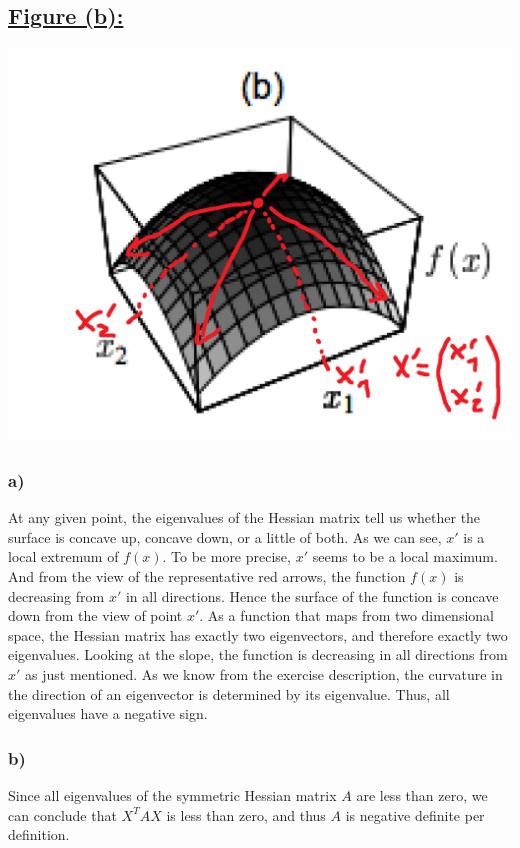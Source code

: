 \documentclass[a4paper]{article}
\begin{document}
\newpage
    \subsection*{\underline{Figure (b):}}
        \includegraphics[width=0.8\linewidth]{Assignment 5/2.png}
        \subsubsection*{a)}
            At any given point, the eigenvalues of the Hessian matrix tell us whether the surface is concave up, concave down, or a little of both.
            As we can see, $x'$ is a local extremum of $f(x)$. To be more precise, $x'$ seems to be a local maximum.
            And from the view of the representative red arrows, the function $f(x)$ is decreasing from $x'$ in all directions.
            Hence the surface of the function is concave down from the view of point $x'$.
            As a function that maps from two dimensional space, the Hessian matrix has exactly two eigenvectors, and therefore exactly two eigenvalues.
            Looking at the slope, the function is decreasing in all directions from $x'$ as just mentioned.
            As we know from the exercise description, the curvature in the direction of an eigenvector is determined by its eigenvalue.
            Thus, all eigenvalues have a negative sign.

        \subsubsection*{b)}
            Since all eigenvalues of the symmetric Hessian matrix $A$ are less than zero, we can conclude that $X^T A X$ is less than zero, and thus $A$ is negative definite per definition.
\end{document}
